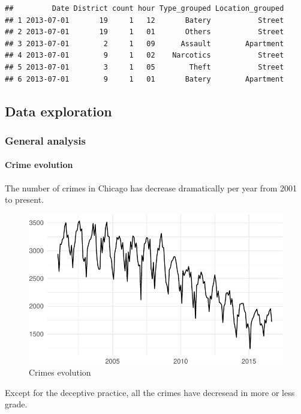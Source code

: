 \documentclass[]{article}
\let\oldparagraph\paragraph
\renewcommand{\paragraph}[1]{\oldparagraph{#1}\mbox{}}
\begin{document}
\begin{verbatim}
##         Date District count hour Type_grouped Location_grouped
## 1 2013-07-01       19     1   12       Batery           Street
## 2 2013-07-01       19     1   01       Others           Street
## 3 2013-07-01        2     1   09      Assault        Apartment
## 4 2013-07-01        9     1   02    Narcotics           Street
## 5 2013-07-01        3     1   05        Theft           Street
## 6 2013-07-01        9     1   01       Batery        Apartment
\end{verbatim}

\subsection{Data exploration}\label{data-exploration}

\subsubsection{General analysis}\label{general-analysis}

\paragraph{Crime evolution}\label{crime-evolution}

The number of crimes in Chicago has decrease dramatically per year from
2001 to present.

\begin{figure}[htbp]
\centering
\includegraphics{Assessment_1v8_files/figure-latex/fig-1.pdf}
\caption{Crimes evolution}
\end{figure}

Except for the deceptive practice, all the crimes have decresead in more
or less grade.
\end{document}
